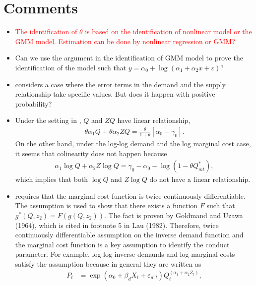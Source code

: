 \documentclass[11pt, a4paper]{article}
\begin{document}
\section{Comments}
    \begin{itemize}
        \item \textcolor{red}{ The identification of $\theta$ is based on the identification of nonlinear model or the GMM model. Estimation can be done by nonlinear regression or GMM?}
        \item Can we use the argument in the identification of GMM model to prove the identification of the model such that  $y = \alpha_0 + \log(\alpha_1 + \alpha_2 x +\varepsilon)?$
        \item \cite{perloff2012collinearity} considers a case where the error terms in the demand and the supply relationship take specific values. But does it happen with positive probability?  
        \item Under the setting in \cite{perloff2012collinearity}, $Q$ and $ZQ$ have linear relationship, 
        \begin{align*}
            \theta \alpha_1 Q + \theta \alpha_2 ZQ = \frac{\theta}{1 + \theta} [\alpha_0 - \gamma_0].
        \end{align*}
        On the other hand, under the log-log demand and the log marginal cost case, it seems that colinearity does not happen because 
        \begin{align*}
            \alpha_1 \log Q + \alpha_2 Z\log Q = \gamma_0 - \alpha_0 -  \log \left(  1 - \theta Q^*_{mt} \right),
        \end{align*}
        which implies that both $\log Q$ and $Z\log Q$ do not have a linear relationship.
        \item \cite{lau1982identifying} requires that the marginal cost function is twice continuously differentiable. The assumption is used to show that there exists a function $F$ such that $g^*(Q,z_2) = F(g(Q,z_2))$. The fact is proven by Goldmand and Uzawa (1964), which is cited in footnote 5 in Lau (1982). Therefore, twice continuously differentiable assumption on the inverse demand function and the marginal cost function is a key assumption to identify the conduct parameter. For example, log-log inverse demands and log-marginal costs satisfy the assumption because in general they are written as 
        \begin{align*}
            P_t &= \exp(\alpha_0+\beta_d X_t + \varepsilon_{d,t})Q_t^{(\alpha_1 + \alpha_2 Z_t)},\\

\end{align*}
\end{itemize}
\end{document}
